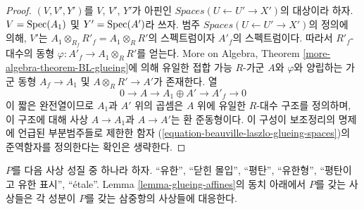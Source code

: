 \begin{proof}
$(V, V', Y')$를 $V$, $V'$, $Y'$가 아핀인
$\textit{Spaces}(U \leftarrow U' \to X')$의 대상이라 하자.
$V = \mathop{\mathrm{Spec}}(A_1)$ 및 $Y' = \mathop{\mathrm{Spec}}(A')$라 쓰자. 범주
$\textit{Spaces}(U \leftarrow U' \to X')$의 정의에 의해,
$V'$는 $A_1 \otimes_{R_f} R'_f = A_1 \otimes_R R'$의 스펙트럼이자
$A'_f$의 스펙트럼이다. 따라서 $R'_f$-대수의 동형
$\varphi : A'_f \to A_1 \otimes_R R'$를 얻는다.
More on Algebra, Theorem \ref{more-algebra-theorem-BL-glueing}에 의해
유일한 접합 가능 $R$-가군 $A$와 $\varphi$와 양립하는 가군 동형
$A_f \to A_1$ 및 $A \otimes_R R' \to A'$가 존재한다. 열
$$
0 \to A \to A_1 \oplus A' \to A'_f \to 0
$$
이 짧은 완전열이므로 $A_1$과 $A'$ 위의 곱셈은 $A$ 위에 유일한
$R$-대수 구조를 정의하며, 이 구조에 대해 사상 $A \to A_1$과
$A \to A'$는 환 준동형이다. 이 구성이 보조정리의 명제에 언급된
부분범주들로 제한한 함자
(\ref{equation-beauville-laszlo-glueing-spaces})의 준역함자를 정의한다는
확인은 생략한다.
\end{proof}

\begin{lemma}
\label{lemma-glueing-affines-etale}
$P$를 다음 사상 성질 중 하나라 하자.
``유한'', ``닫힌 몰입'', ``평탄'', ``유한형'',
``평탄이고 유한 표시'', ``\'etale''.
Lemma \ref{lemma-glueing-affines}의 동치 아래에서 $P$를 갖는 사상들은
각 성분이 $P$를 갖는 삼중항의 사상들에 대응한다.
\end{lemma}

